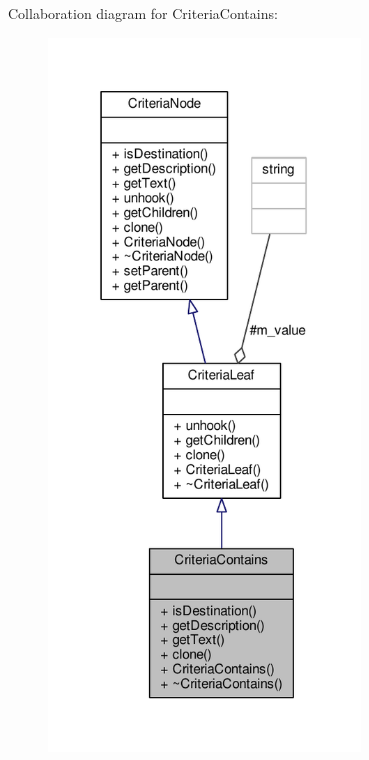 Collaboration diagram for Criteria\+Contains\+:
\nopagebreak
\begin{figure}[H]
\begin{center}
\leavevmode
\includegraphics[width=235pt]{d1/dbd/classCriteriaContains__coll__graph}
\end{center}
\end{figure}
